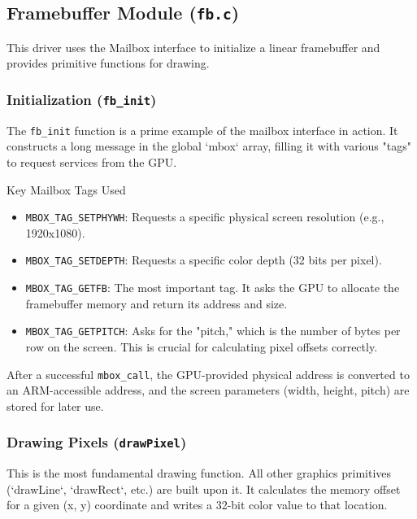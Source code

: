 \documentclass[a4paper, 11pt]{article}
\begin{document}
	\subsection{Framebuffer Module (\texttt{fb.c})}
	This driver uses the Mailbox interface to initialize a linear framebuffer and provides primitive functions for drawing.
	
	\subsubsection{Initialization (\texttt{fb\_init})}
	The \texttt{fb\_init} function is a prime example of the mailbox interface in action. It constructs a long message in the global `mbox` array, filling it with various "tags" to request services from the GPU.
	
	\begin{infobox}{Key Mailbox Tags Used}
		\begin{itemize}
			\item \texttt{MBOX\_TAG\_SETPHYWH}: Requests a specific physical screen resolution (e.g., 1920x1080).
			\item \texttt{MBOX\_TAG\_SETDEPTH}: Requests a specific color depth (32 bits per pixel).
			\item \texttt{MBOX\_TAG\_GETFB}: The most important tag. It asks the GPU to allocate the framebuffer memory and return its address and size.
			\item \texttt{MBOX\_TAG\_GETPITCH}: Asks for the "pitch," which is the number of bytes per row on the screen. This is crucial for calculating pixel offsets correctly.
		\end{itemize}
	\end{infobox}
	
	After a successful \texttt{mbox\_call}, the GPU-provided physical address is converted to an ARM-accessible address, and the screen parameters (width, height, pitch) are stored for later use.
	
	\subsubsection{Drawing Pixels (\texttt{drawPixel})}
	This is the most fundamental drawing function. All other graphics primitives (`drawLine`, `drawRect`, etc.) are built upon it. It calculates the memory offset for a given (x, y) coordinate and writes a 32-bit color value to that location.
	
\end{document}
